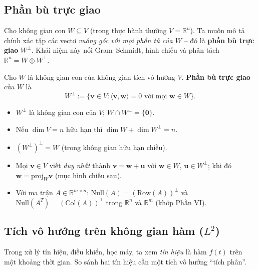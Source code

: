 \documentclass[12pt,a4paper]{article}
\begin{document}
\subsection{Phần bù trực giao}

\begin{dongco}
Cho không gian con $W \subseteq V$ (trong thực hành thường $V = \mathbb{R}^n$). Ta muốn mô tả chính xác tập các vectơ \emph{vuông góc với mọi phần tử của $W$} -- đó là \textbf{phần bù trực giao} $W^\perp$. Khái niệm này nối Gram--Schmidt, hình chiếu và phân tách $\mathbb{R}^n = W \oplus W^\perp$.
\end{dongco}

\begin{dinhnghia}
Cho $W$ là không gian con của không gian tích vô hướng $V$. \textbf{Phần bù trực giao} của $W$ là
\[
  W^\perp := \{\mathbf{v} \in V : \langle \mathbf{v}, \mathbf{w}\rangle = 0 \text{ với mọi } \mathbf{w} \in W\}.
\]
\end{dinhnghia}

\begin{tinhchat}
\begin{itemize}
  \item $W^\perp$ là không gian con của $V$; $W \cap W^\perp = \{\mathbf{0}\}$.
  \item Nếu $\dim V = n$ hữu hạn thì $\dim W + \dim W^\perp = n$.
  \item $(W^\perp)^\perp = W$ (trong không gian hữu hạn chiều).
  \item Mọi $\mathbf{v} \in V$ viết \emph{duy nhất} thành $\mathbf{v} = \mathbf{w} + \mathbf{u}$ với $\mathbf{w} \in W$, $\mathbf{u} \in W^\perp$; khi đó $\mathbf{w} = \mathrm{proj}_W \mathbf{v}$ (mục hình chiếu sau).
  \item Với ma trận $A \in \mathbb{R}^{m \times n}$: $\mathrm{Null}(A) = (\mathrm{Row}(A))^\perp$ và $\mathrm{Null}(A^T) = (\mathrm{Col}(A))^\perp$ trong $\mathbb{R}^n$ và $\mathbb{R}^m$ (khớp Phần VI).
\end{itemize}
\end{tinhchat}

\subsection{Tích vô hướng trên không gian hàm ($L^2$)}

\begin{dongco}
Trong xử lý tín hiệu, điều khiển, học máy, ta xem \emph{tín hiệu} là hàm $f(t)$ trên một khoảng thời gian. So sánh hai tín hiệu cần một tích vô hướng ``tích phân''.
\end{dongco}
\end{document}
